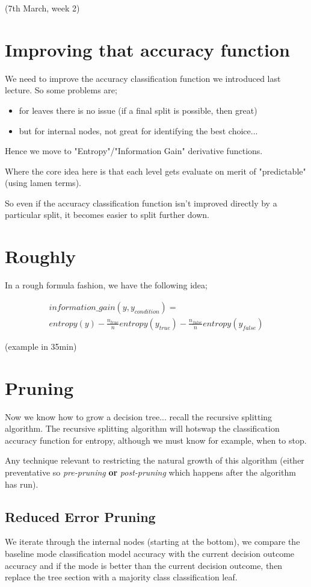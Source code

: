 \documentclass{article}
\begin{document}
(7th March, week 2)
\section*{Improving that accuracy function}
We need to improve the accuracy classification function we introduced last lecture. So some problems are;
\begin{itemize}
	\item for leaves there is no issue (if a final split is possible, then great) 
	\item but for internal nodes, not great for identifying the best choice...
\end{itemize}

Hence we move to "Entropy"/"Information Gain" derivative functions.

Where the core idea here is that each level gets evaluate on merit of "predictable" (using lamen terms).

So even if the accuracy classification function isn't improved directly by a particular split, it becomes easier to split further down.

\section*{Roughly}
In a rough formula fashion, we have the following idea;

\begin{align*}
	information\_gain(y, y_{condition}) = \\
	entropy(y) - \frac{n_{true}}{n}entropy(y_{true}) - \frac{n_{false}}{n}entropy(y_{false})
\end{align*}

(example in 35min)

\section*{Pruning}
Now we know how to grow a decision tree... recall the recursive splitting algorithm. The recursive splitting algorithm will hotswap the classification accuracy function for entropy, although we must know for example, when to stop.

Any technique relevant to restricting the natural growth of this algorithm (either preventative so {\em pre-pruning} {\bf or} {\em post-pruning} which happens after the algorithm has run).

\subsection*{Reduced Error Pruning}
We iterate through the internal nodes (starting at the bottom), we compare the baseline mode classification model accuracy with the current decision outcome accuracy and if the mode is better than the current decision outcome, then replace the tree section with a majority class classification leaf.
\end{document}
